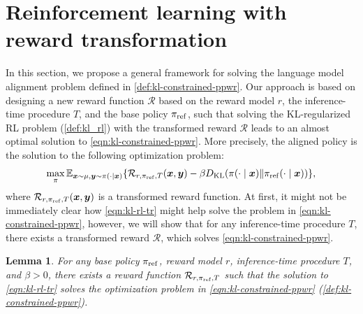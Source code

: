 \documentclass{article}
\newcommand{\by}{{\bm{y}}}
\newcommand{\bx}{{\bm{x}}}
\newcommand{\cR}{\mathcal{R}}
\newcommand{\tr}{\cR}
\newcommand{\reg}{\beta}
\newcommand{\KL}{D_{\text{KL}}}
\newcommand{\bp}{{\pi_{\rm ref}}} %
\newcommand{\op}{\pi} %
\newtheorem{lemma}{Lemma}
\begin{document}
%

%

%
%

%
%
%
%
%



%
%
%


%

\section{Reinforcement learning with reward transformation} \label{sec:calibration}
In this section, we propose a general framework for solving the language model alignment problem defined in \cref{def:kl-constrained-ppwr}. Our approach is based on designing a new reward function $\tr$ based on the reward model $r$, the inference-time procedure $T$, and the base policy $\bp$, such that solving the KL-regularized RL problem (\cref{def:kl_rl}) with the transformed reward $\tr$ leads to an almost optimal solution to \cref{eqn:kl-constrained-ppwr}. More precisely, %
the aligned policy is the solution to the following optimization problem:
%
\begin{equation} \label{eqn:kl-rl-tr}
    \max_\pi \mathbb{E}_{\bx \sim \mu, \by \sim \op(\cdot \mid \bx)} \{\tr_{r, \bp, T}(\bx, \by) - \reg \KL(\op(\cdot \mid \bx) \| \bp(\cdot \mid \bx))\},
\end{equation}
where $\tr_{r, \bp, T}(\bx, \by)$ is a transformed reward function.
%
%
%
%
%
At first, it might not be immediately clear how \cref{eqn:kl-rl-tr} might help solve the problem in \cref{eqn:kl-constrained-ppwr}, however, we will show that for any inference-time procedure $T$, there exists a transformed reward $\tr$, which solves \cref{eqn:kl-constrained-ppwr}.
%


\begin{lemma} \label{thm:exisitence_informal}
For any base policy $\bp$, reward model $r$, inference-time procedure $T$, and $\reg > 0$, there exists a reward function $\tr_{r, \bp, T}$  such that the solution to \cref{eqn:kl-rl-tr} solves the optimization problem in \cref{eqn:kl-constrained-ppwr} (\cref{def:kl-constrained-ppwr}).
%
%
%
%
%
\end{lemma}
\end{document}
